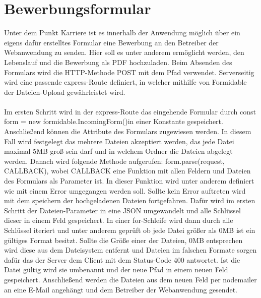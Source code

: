 \section{Bewerbungsformular}
Unter dem Punkt Karriere ist es innerhalb der Anwendung möglich über ein eigens dafür erstelltes Formular eine Bewerbung an den Betreiber der Webanwendung zu senden. Hier soll es unter anderem ermöglicht werden, den Lebenslauf und die Bewerbung als PDF hochzuladen. Beim Absenden des Formulars wird die HTTP-Methode POST mit dem Pfad \glqq \thickspace verwendet. Serverseitig wird eine passende express-Route definiert, in welcher mithilfe von Formidable der Dateien-Upload gewährleistet wird.
\\
\\
Im ersten Schritt wird in der express-Route das eingehende Formular durch \newline \glqq const form = new formidable.IncomingForm()\grqq \thickspace in einer Konstante gespeichert. Anschließend können die Attribute des Formulars zugewiesen werden. In diesem Fall wird festgelegt das mehrere Dateien akzeptiert werden, das jede Datei maximal 5MB groß sein darf und in welchem Ordner die Dateien abgelegt werden. Danach wird folgende Methode aufgerufen: \glqq form.parse(request, CALLBACK)\grqq \thickspace, wobei CALLBACK eine Funktion mit allen Feldern und Dateien des Formulars als Parameter ist. In dieser Funktion wird unter anderem definiert wie mit einem Error umgegangen werden soll. Sollte kein Error auftreten wird mit dem speichern der hochgeladenen Dateien fortgefahren. Dafür wird im ersten Schritt der Dateien-Parameter in eine JSON umgewandelt und alle Schlüssel dieser in einem Feld gespeichert. In einer for-Schleife wird dann durch alle Schlüssel iteriert und unter anderem geprüft ob jede Datei größer als 0MB ist ein gültiges Format besitzt. Sollte die Größe einer der Dateien, 0MB entsprechen wird diese aus dem Dateisystem entfernt und Dateien im falschen Formate sorgen dafür das der Server dem Client mit dem Status-Code 400 antwortet. Ist die Datei gültig wird sie umbenannt und der neue Pfad in einem neuen Feld gespeichert. Anschließend werden die Dateien aus dem neuen Feld per nodemailer an eine E-Mail angehängt und dem Betreiber der Webanwendung gesendet.

